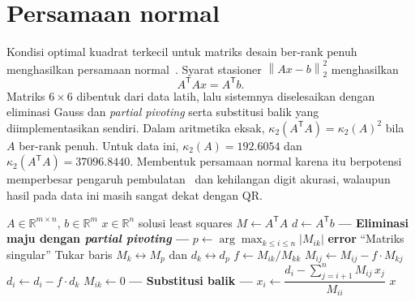 \documentclass[12pt,a4paper]{article}
\numberwithin{equation}{section}
\newcommand{\R}{\mathbb{R}}
\newcommand{\norm}[1]{\left\lVert #1\right\rVert_2}
\begin{document}
\section{Persamaan normal}
Kondisi optimal kuadrat terkecil untuk matriks desain ber-rank penuh menghasilkan persamaan normal~\cite{trefethen}. Syarat stasioner $\norm{Ax-b}^{2}$ menghasilkan
\begin{equation}
A^\mathsf{T}Ax=A^\mathsf{T}b.
\end{equation}
Matriks $6\times6$ dibentuk dari data latih, lalu sistemnya diselesaikan dengan eliminasi Gauss dan \emph{partial pivoting} serta substitusi balik yang diimplementasikan sendiri. Dalam aritmetika eksak, $\kappa_2(A^\mathsf{T}A)=\kappa_2(A)^2$ bila $A$ ber-rank penuh. Untuk data ini, $\kappa_2(A)=192.6054$ dan $\kappa_2(A^\mathsf{T}A)=37096.8440$. Membentuk persamaan normal karena itu berpotensi memperbesar pengaruh pembulatan~\cite{higham,trefethen} dan kehilangan digit akurasi, walaupun hasil pada data ini masih sangat dekat dengan QR.

\begin{algorithm}[H]
\caption{Penyelesaian Persamaan Normal via Eliminasi Gauss dengan \emph{Partial Pivoting}}
\begin{algorithmic}[1]
\Require $A\in\R^{m\times n}$, $b\in\R^m$
\Ensure $x\in\R^n$ solusi least squares
\State $M \gets A^\mathsf{T}A$ 
\State $d \gets A^\mathsf{T}b$ 
\Statex \textbf{--- Eliminasi maju dengan \emph{partial pivoting} ---}
    \State $p \gets \arg\max_{k \le i \le n} |M_{ik}|$ 
        \State \textbf{error} ``Matriks singular''
    \EndIf
    \State Tukar baris $M_k \leftrightarrow M_p$ dan $d_k \leftrightarrow d_p$
        \State $f \gets M_{ik} / M_{kk}$
            \State $M_{ij} \gets M_{ij} - f \cdot M_{kj}$
        \EndFor
        \State $d_i \gets d_i - f \cdot d_k$
        \State $M_{ik} \gets 0$
    \EndFor
\EndFor
\Statex \textbf{--- Substitusi balik ---}
    \State $x_i \gets \dfrac{d_i - \sum_{j=i+1}^{n} M_{ij}\, x_j}{M_{ii}}$
\EndFor
\State \Return $x$
\end{algorithmic}
\end{algorithm}
\end{document}

